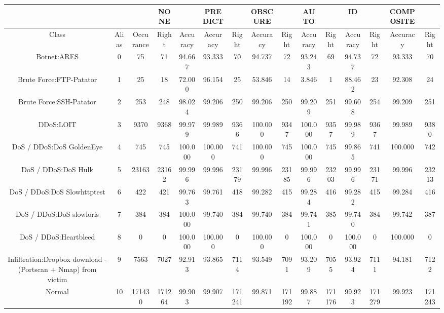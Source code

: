 \begin{table}[htb]
    \centering
    \begin{tabular}{@{}ccccccccccccccc@{}}
        \toprule
         &  &  & NONE &  & PREDICT &  & OBSCURE &  & AUTO &  & ID &  & COMPOSITE &  \\
        \midrule
        Class &  Alias &  Occurance &  Right &  Accuracy &  Accuracy &  Right &  Accuracy &  Right &  Accuracy &  Right &  Accuracy &  Right &  Accuracy &  Right \\
        Botnet:ARES &  0 &  75 &  71 &  94.667 &  93.333 &  70 &  94.737 &  72 &  93.243 &  69 &  94.737 &  72 &  93.333 &  70 \\
        Brute Force:FTP-Patator &  1 &  25 &  18 &  72.000 &  96.154 &  25 &  53.846 &  14 &  3.846 &  1 &  88.462 &  23 &  92.308 &  24 \\
        Brute Force:SSH-Patator &  2 &  253 &  248 &  98.024 &  99.206 &  250 &  99.206 &  250 &  99.209 &  251 &  99.608 &  254 &  99.209 &  251 \\
        DDoS:LOIT &  3 &  9370 &  9368 &  99.979 &  99.989 &  9366 &  100.000 &  9347 &  100.000 &  9357 &  99.989 &  9367 &  99.989 &  9380 \\
        DoS / DDoS:DoS GoldenEye &  4 &  745 &  745 &  100.000 &  100.000 &  741 &  100.000 &  745 &  100.000 &  745 &  99.865 &  741 &  100.000 &  742 \\
        DoS / DDoS:DoS Hulk &  5 &  23163 &  23162 &  99.996 &  99.996 &  23179 &  99.996 &  23185 &  99.996 &  23203 &  99.996 &  23171 &  99.996 &  23213 \\
        DoS / DDoS:DoS Slowhttptest &  6 &  422 &  421 &  99.763 &  99.761 &  418 &  99.282 &  415 &  99.284 &  416 &  99.282 &  415 &  99.284 &  416 \\
        DoS / DDoS:DoS slowloris &  7 &  384 &  384 &  100.000 &  99.740 &  384 &  99.740 &  384 &  99.741 &  385 &  99.740 &  384 &  99.742 &  387 \\
        DoS / DDoS:Heartbleed &  8 &  0 &  0 &  100.000 &  100.000 &  0 &  100.000 &  0 &  100.000 &  0 &  100.000 &  0 &  100.000 &  0 \\
        Infiltration:Dropbox download - (Portscan + Nmap) from victim &  9 &  7563 &  7027 &  92.913 &  93.865 &  7114 &  93.549 &  7091 &  93.209 &  7055 &  93.924 &  7111 &  94.181 &  7122 \\
        Normal &  10 &  171430 &  171264 &  99.903 &  99.907 &  171241 &  99.871 &  171192 &  99.887 &  171176 &  99.923 &  171279 &  99.923 &  171243 \\

\end{tabular}
\end{table}
